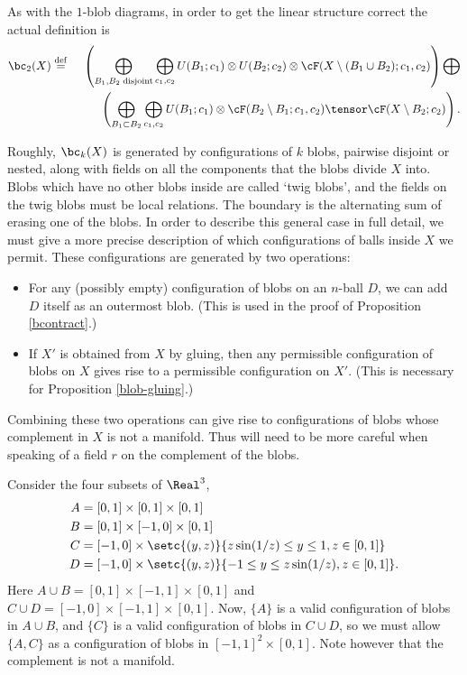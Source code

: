 As with the $1$-blob diagrams, in order to get the linear structure correct the actual definition is 
\begin{eqnarray*}
	\bc_2(X) & \deq &
	\left( 
		\bigoplus_{B_1, B_2\; \text{disjoint}} \bigoplus_{c_1, c_2}
			U(B_1; c_1) \otimes U(B_2; c_2) \otimes \cF(X\setmin (B_1\cup B_2); c_1, c_2)
	\right)  \bigoplus \\
	&& \quad\quad  \left( 
		\bigoplus_{B_1 \subset B_2} \bigoplus_{c_1, c_2}
			U(B_1; c_1) \otimes \cF(B_2 \setmin B_1; c_1, c_2) \tensor \cF(X \setminus B_2; c_2)
	\right) .
\end{eqnarray*}

\medskip

Roughly, $\bc_k(X)$ is generated by configurations of $k$ blobs, pairwise disjoint or nested, along with fields on all the components that the blobs divide $X$ into. Blobs which have no other blobs inside are called `twig blobs', and the fields on the twig blobs must be local relations.
The boundary is the alternating sum of erasing one of the blobs.
In order to describe this general case in full detail, we must give a more precise description of
which configurations of balls inside $X$ we permit.
These configurations are generated by two operations:
\begin{itemize}
\item For any (possibly empty) configuration of blobs on an $n$-ball $D$, we can add
$D$ itself as an outermost blob.
(This is used in the proof of Proposition \ref{bcontract}.)
\item If $X'$ is obtained from $X$ by gluing, then any permissible configuration of blobs
on $X$ gives rise to a permissible configuration on $X'$.
(This is necessary for Proposition \ref{blob-gluing}.)
\end{itemize}
Combining these two operations can give rise to configurations of blobs whose complement in $X$ is not
a manifold.
Thus will need to be more careful when speaking of a field $r$ on the complement of the blobs.

\begin{example}
Consider the four subsets of $\Real^3$,
\begin{align*}
A & = [0,1] \times [0,1] \times [0,1] \\
B & = [0,1] \times [-1,0] \times [0,1] \\
C & = [-1,0] \times \setc{(y,z)}{z \sin(1/z) \leq y \leq 1, z \in [0,1]} \\
D & = [-1,0] \times \setc{(y,z)}{-1 \leq y \leq z \sin(1/z), z \in [0,1]}.
\end{align*}
Here $A \cup B = [0,1] \times [-1,1] \times [0,1]$ and $C \cup D = [-1,0] \times [-1,1] \times [0,1]$. Now, $\{A\}$ is a valid configuration of blobs in $A \cup B$, and $\{C\}$ is a valid configuration of blobs in $C \cup D$, so we must allow $\{A, C\}$ as a configuration of blobs in $[-1,1]^2 \times [0,1]$. Note however that the complement is not a manifold.
\end{example}

